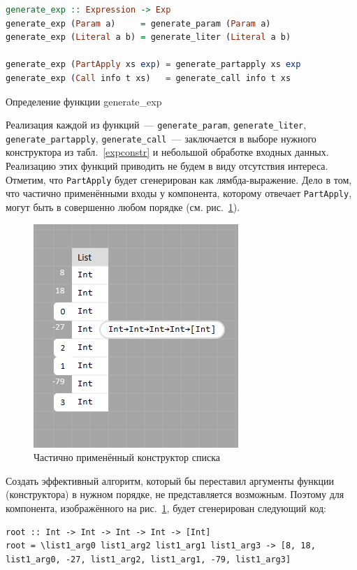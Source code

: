 \begin{ListingEnv}[h]
\begin{lstlisting}[language=Haskell]
generate_exp :: Expression -> Exp
generate_exp (Param a)     = generate_param (Param a)
generate_exp (Literal a b) = generate_liter (Literal a b)

generate_exp (PartApply xs exp) = generate_partapply xs exp
generate_exp (Call info t xs)   = generate_call info t xs
\end{lstlisting}
	\caption{Определение функции generate\_exp}\label{genexp}
\end{ListingEnv}

		Реализация каждой из функций~--- \lstinline!generate_param!, \lstinline!generate_liter!, \lstinline!generate_partapply!, \lstinline!generate_call!~--- заключается в выборе нужного конструктора из табл.~\ref{expconstr} и небольшой обработке входных данных. Реализацию этих функций приводить не будем в виду отсутствия интереса. Отметим, что \lstinline!PartApply! будет сгенерирован как лямбда-выражение. Дело в том, что частично применёнными входы у компонента, которому отвечает \lstinline!PartApply!, могут быть в совершенно любом порядке (см. рис.~\ref{part_list}). 		
		\begin{figure}[h]
			\centering
			\includegraphics{img/partapply.PNG}
			\caption{Частично применённый конструктор списка}\label{part_list}
		\end{figure}
	Создать эффективный алгоритм, который бы переставил аргументы функции (конструктора) в нужном порядке, не представляется возможным. Поэтому для компонента, изображённого на рис.~\ref{part_list}, будет сгенерирован следующий код:
		
\begin{ListingEnv}[H]
	\begin{lstlisting}
root :: Int -> Int -> Int -> Int -> [Int]
root = \list1_arg0 list1_arg2 list1_arg1 list1_arg3 -> [8, 18, list1_arg0, -27, list1_arg2, list1_arg1, -79, list1_arg3]
	\end{lstlisting}
\end{ListingEnv}		

